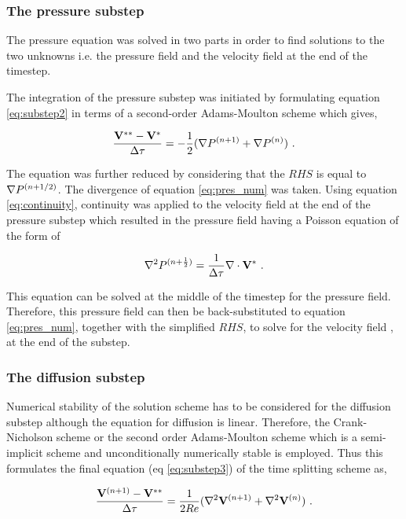  
\subsubsection{The pressure substep}

The pressure equation was solved in two parts in order to find solutions to the two unknowns i.e. the pressure field and the velocity field at the end of the timestep. 
 
The integration of the pressure substep was initiated by formulating equation \ref{eq:substep2} in terms of a second-order Adams-Moulton scheme which gives,
 
\begin{equation} \centering
\label{eq:pres_num}
\frac{\Vintint - \Vint}{\Delta\tau} = -\frac{1}{2}(\grad\Pres^{(n+1)} + \grad\Pres^{(n)}) ~.
\end{equation}

The equation was further reduced by considering that the $RHS$ is equal to $\nabla P^{(n+1/2)}$. The divergence of equation \ref{eq:pres_num} was taken. Using equation \ref{eq:continuity}, continuity was applied to the velocity field at the end of the pressure substep which resulted in the pressure field having a Poisson equation of the form of 

\begin{equation} \centering
\label{eq:poisson}
\gradsq\Pres^{(n+\frac{1}{2})} = \frac{1}{\Delta\tau}\divergence{\Vint} ~.
\end{equation} 

This equation can be solved at the middle of the timestep for the pressure field. Therefore, this pressure field can then be back-substituted to equation \ref{eq:pres_num}, together with the simplified $RHS$, to solve for the velocity field \Vintint, at the end of the substep. 

\subsubsection{The diffusion substep}

Numerical stability of the solution scheme has to be considered for the diffusion substep although the equation for diffusion is linear. Therefore, the Crank-Nicholson scheme or the second order Adams-Moulton scheme which is a semi-implicit scheme and unconditionally numerically stable is employed. Thus this formulates the final equation (eq \ref{eq:substep3}) of the time splitting scheme as,

\begin{equation} \centering
\label{eq:diff_num}
\frac{\Vnext - \Vintint}{\Delta\tau} = \frac{1}{2\reynoldsnumber}(\gradsq{\Vnext} + \gradsq{\vecV^{(n)}}) ~.
\end{equation}

